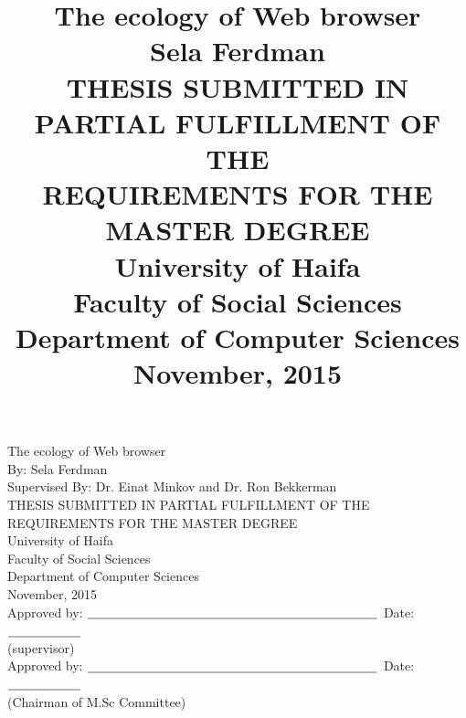 \documentclass[11pt,oneside]{book}
\newcommand{\bigspace}{\mbox{\hspace{10mm}}}
\begin{document}
\title{\Huge{The ecology of Web browser}
                \huge
             \\[10mm] Sela Ferdman
             \\[25mm] \Large THESIS SUBMITTED IN PARTIAL FULFILLMENT OF THE
             \\       REQUIREMENTS FOR THE MASTER DEGREE
             \\[15mm] University of Haifa
             \\       Faculty of Social Sciences
             \\       Department of Computer Sciences
             \\[10mm] November, 2015
}
\author{}
\date{}
\maketitle{}

\pagestyle{plain}

\begin{center}
\Huge
     The ecology of Web browser
\huge
\\[10mm] By: Sela Ferdman
\\[3mm] Supervised By: Dr. Einat Minkov and Dr. Ron Bekkerman
\Large
\\ [10mm]THESIS SUBMITTED IN PARTIAL FULFILLMENT OF THE
\\ REQUIREMENTS FOR THE MASTER DEGREE
\\ [10mm]University of Haifa
\\ [1mm]Faculty of Social Sciences
\\ [1mm]Department of Computer Sciences
\\ [3mm]November, 2015
\\ [8mm] Approved by:
$\underline{\bigspace\bigspace\bigspace\bigspace\bigspace\bigspace\bigspace\bigspace}$
   \bigspace    Date:$\underline{\bigspace\bigspace}$
\\ (supervisor)\bigspace
\\ [3mm]Approved by:
$\underline{\bigspace\bigspace\bigspace\bigspace\bigspace\bigspace\bigspace\bigspace}$
   \bigspace    Date:$\underline{\bigspace\bigspace}$
\\ (Chairman of  M.Sc Committee) \bigspace

\end{center}

\end{document}
